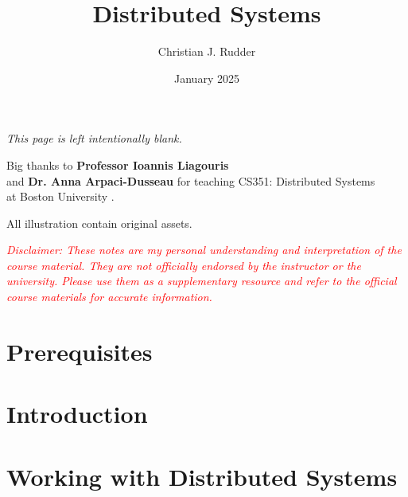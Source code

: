 \documentclass{memoir}
\title{Distributed Systems}
\author{Christian J. Rudder}
\date{January 2025}
\begin{document}
\maketitle
\setcounter{secnumdepth}{2}
\setcounter{tocdepth}{3}

\tableofcontents

\newpage
\thispagestyle{empty}
\mbox{}
\vfill
\begin{center}
    \textit{This page is left intentionally blank.}
\end{center}
\vfill
\newpage
\thispagestyle{empty}
\mbox{}
\vfill
\begin{center}
    \Large{Big thanks to \textbf{Professor Ioannis Liagouris}}\\
    and \textbf{Dr. Anna Arpaci-Dusseau} 
    \normalsize 
    for teaching CS351: Distributed Systems\\
    at Boston University \cite{liagouris_cs351}.\\
\end{center}

\vfill

\begin{center}
    \noindent All illustration contain original assets.
\end{center}
    \begin{center}
        \textcolor{red}{\textit{Disclaimer: These notes are my personal understanding and interpretation of the course material. 
        They are not officially endorsed by the instructor or the university. Please use them as a supplementary resource and refer 
        to the official course materials for accurate information.}}
    \end{center}

    \chapter*{Prerequisites}
    
    
\chapter{Introduction}





\chapter{Working with Distributed Systems}







\end{document}
